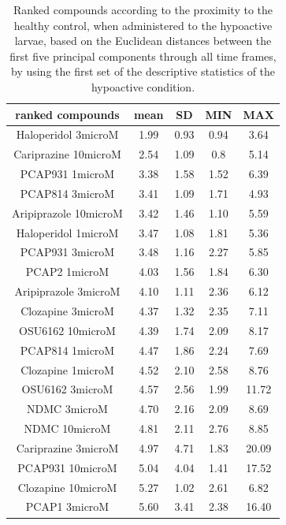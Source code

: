 \begin{table}[h!]\tiny
\centering
\caption{Ranked compounds according to the proximity to the healthy control, when administered to the hypoactive larvae, based on the Euclidean distances between the first five principal components through all time frames, by using the first set of the descriptive statistics of the hypoactive condition.}
\begin{tabular}{|c|c|c|c|c|}
\hline
ranked compounds             & mean & SD   & MIN  & MAX   \\ \hline
Haloperidol 3microM   & 1.99  & 0.93  & 0.94 & 3.64  \\ \hline
Cariprazine 10microM  & 2.54  & 1.09  & 0.8  & 5.14  \\ \hline
PCAP931 1microM       & 3.38  & 1.58  & 1.52 & 6.39  \\ \hline
PCAP814 3microM       & 3.41  & 1.09  & 1.71 & 4.93  \\ \hline
Aripiprazole 10microM & 3.42  & 1.46  & 1.10  & 5.59  \\ \hline
Haloperidol 1microM   & 3.47  & 1.08  & 1.81 & 5.36  \\ \hline
PCAP931 3microM       & 3.48  & 1.16  & 2.27 & 5.85  \\ \hline
PCAP2 1microM         & 4.03  & 1.56  & 1.84 & 6.30   \\ \hline
Aripiprazole 3microM  & 4.10   & 1.11  & 2.36 & 6.12  \\ \hline
Clozapine 3microM     & 4.37  & 1.32  & 2.35 & 7.11  \\ \hline
OSU6162 10microM      & 4.39  & 1.74  & 2.09 & 8.17  \\ \hline
PCAP814 1microM       & 4.47  & 1.86  & 2.24 & 7.69  \\ \hline
Clozapine 1microM     & 4.52  & 2.10   & 2.58 & 8.76  \\ \hline
OSU6162 3microM       & 4.57  & 2.56  & 1.99 & 11.72 \\ \hline
NDMC 3microM          & 4.70   & 2.16  & 2.09 & 8.69  \\ \hline
NDMC 10microM         & 4.81  & 2.11  & 2.76 & 8.85  \\ \hline
Cariprazine 3microM   & 4.97  & 4.71  & 1.83 & 20.09 \\ \hline
PCAP931 10microM      & 5.04  & 4.04  & 1.41 & 17.52 \\ \hline
Clozapine 10microM    & 5.27  & 1.02  & 2.61 & 6.82  \\ \hline
PCAP1 3microM         & 5.60   & 3.41  & 2.38 & 16.40  \\ \hline

\end{tabular}
\end{table}

